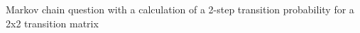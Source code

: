 

\item Markov chain question with a calculation of a 2-step transition 
probability for a 2x2 transition matrix